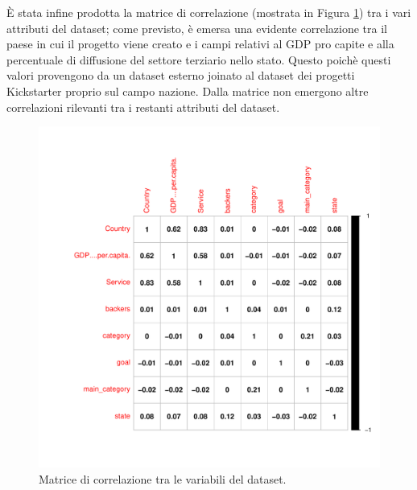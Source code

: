 È stata infine prodotta la matrice di correlazione (mostrata in Figura \ref{fig:corrplot}) tra i vari attributi del dataset; come previsto, è emersa una evidente correlazione tra il paese in cui il progetto viene creato e i campi relativi al GDP pro capite e alla percentuale di diffusione del settore terziario nello stato. Questo poichè questi valori provengono da un dataset esterno joinato al dataset dei progetti Kickstarter proprio sul campo nazione. Dalla matrice non emergono altre correlazioni rilevanti tra i restanti attributi del dataset.

\begin{figure}
	\centering
	\includegraphics[width=1\linewidth]{../FinalResults/Images/Data_exploration_plots/corrplot}
	\caption{Matrice di correlazione tra le variabili del dataset.}
	\label{fig:corrplot}
\end{figure}


